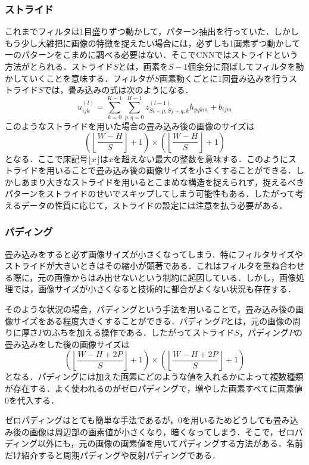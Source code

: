 \documentclass[a4paper,11pt]{jsreport}
\begin{document}
\subsubsection{ストライド}
これまでフィルタは1目盛りずつ動かして，パターン抽出を行っていた．しかしもう少し大雑把に画像の特徴を捉えたい場合には，必ずしも1画素ずつ動かして一のパターンをこまめに調べる必要はない．そこでCNNではストライドという方法がとられる．ストライド$S$とは，画素を$S-1$個余分に飛ばしてフィルタを動かしていくことを意味する．フィルタが$S$画素動くごとに1回畳み込みを行うストライド$S$では，畳み込みの式は次のようになる．
\begin{equation}
  u_{ijk}^{(l)}
  = \sum_{k=0}^{K-1}\sum_{p,q=0}^{H-1} z_{Si+p,Sj+q,k}^{(l-1)} h_{pqkm} + b_{ijm}
\end{equation}
このようなストライドを用いた場合の畳み込み後の画像のサイズは
\begin{equation}
  \left(\left\lfloor \frac{W-H}{S} \right\rfloor + 1\right) \times \left(\left\lfloor \frac{W-H}{S} \right\rfloor + 1\right)
\end{equation}
となる．ここで床記号$\lfloor x \rfloor$は$x$を超えない最大の整数を意味する．このようにストライドを用いることで畳み込み後の画像サイズを小さくすることができる．しかしあまり大きなストライドを用いるとこまめな構造を捉えられず，捉えるべきパターンをストライドのせいでスキップしてしまう可能性もある．したがって考えるデータの性質に応じて，ストライドの設定には注意を払う必要がある．

\subsubsection{パディング}
畳み込みをすると必ず画像サイズが小さくなってしまう．特にフィルタサイズやストライドが大きいときはその縮小が顕著である．これはフィルタを重ね合わせる際に，元の画像からはみ出せないという制約に起因している．しかし，画像処理では，画像サイズが小さくなると技術的に都合がよくない状況も存在する．\par
そのような状況の場合，パディングという手法を用いることで，畳み込み後の画像サイズをある程度大きくすることができる．パディング$P$とは，元の画像の周りに厚さ$P$のふちを加える操作である．したがってストライド$S$，パディング$P$の畳み込みをした後の画像サイズは
\begin{equation}
  \left(\left\lfloor \frac{W-H+2P}{S} \right\rfloor + 1\right) \times \left(\left\lfloor \frac{W-H+2P}{S} \right\rfloor + 1\right)
\end{equation}
となる．パディングには加えた画素にどのような値を入れるかによって複数種類が存在する．よく使われるのがゼロパディングで，増やした画素すべてに画素値0を代入する．\par
ゼロパディングはとても簡単な手法であるが，0を用いるためどうしても畳み込み後の画像は周辺部の画素値が小さくなり，暗くなってしまう．そこで，ゼロパディング以外にも，元の画像の画素値を用いてパディングする方法がある．名前だけ紹介すると周期パディングや反射パディングである．
\end{document}
